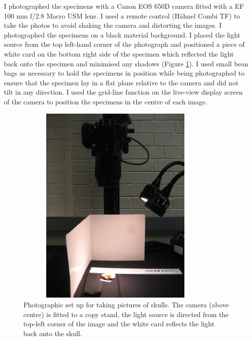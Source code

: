 	I photographed the specimens with a Canon EOS 650D camera fitted with a EF 100 mm f/2.8 Macro USM lens. I used a remote control (H\"ahnel Combi TF) to take the photos to avoid shaking the camera and distorting the images. I photographed the specimens on a black material background. I placed the light source from the top left-hand corner of the photograph and positioned a piece of white card on the bottom right side of the specimen which reflected the light back onto the specimen and minimised any shadows (Figure \ref{fig:camera}). I used small bean bags as necessary to hold the specimens in position while being photographed to ensure that the specimen lay in a flat plane relative to the camera and did not tilt in any direction. I used the grid-line function on the live-view display screen of the camera to position the specimens in the centre of each image. 

\begin{figure}[h] 
  \centering
  \includegraphics[width=10cm, height=10cm, keepaspectratio=true]{Methods/figures/camera.jpg}
    \caption[Photographic set up]
    {Photographic set up for taking pictures of skulls. The camera (above centre) is fitted to a copy stand, the light source is directed from the top-left corner of the image and the white card reflects the light back onto the skull. }
  \label{fig:camera}
  \end{figure}

